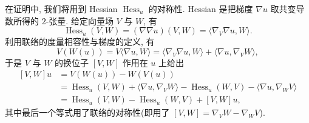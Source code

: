 在证明中, 我们将用到 Hessian $\operatorname{Hess}_u$ 的对称性.
Hessian 是把梯度 $\nabla u$ 取共变导数所得的 $2$-张量. 给定向量场 $V$ 与
$W$, 有
\begin{equation}
\operatorname{Hess}_u(V,W)=(\nabla\nabla u)(V,W)
 =\langle\nabla_V\nabla u,W\rangle.
\label{eq:1.237}
\end{equation}
利用联络的度量相容性与梯度的定义, 有
\begin{equation}
V(W(u))=V\langle\nabla u,W\rangle
 =\langle\nabla_V\nabla u,W\rangle
 +\langle\nabla u,\nabla_VW\rangle,
\label{eq:1.238}
\end{equation}
于是 $V$ 与 $W$ 的换位子 $[V,W]$ 作用在 $u$ 上给出
\begin{equation}
\begin{aligned}
[V,W]u&=V(W(u))-W(V(u))\\
&=\operatorname{Hess}_u(V,W)+\langle\nabla u,\nabla_VW\rangle
 -\operatorname{Hess}_u(W,V)-\langle\nabla u,\nabla_WV\rangle\\
&=\operatorname{Hess}_u(V,W)-\operatorname{Hess}_u(W,V)+[V,W]u,
\end{aligned}
\label{eq:1.239}
\end{equation}
其中最后一个等式用了联络的对称性(即用了
$[V,W]=\nabla_VW-\nabla_WV$).


